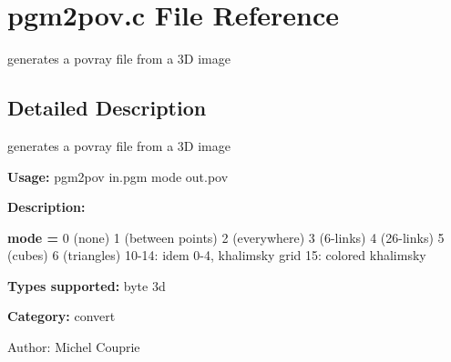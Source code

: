 \section{pgm2pov.c File Reference}
\label{pgm2pov_8c}
generates a povray file from a 3D image  




\label{_details}
\subsection{Detailed Description}
generates a povray file from a 3D image 

{\bf Usage:} pgm2pov in.pgm mode out.pov

{\bf Description:}

{\bf mode = } 0 (none) 1 (between points) 2 (everywhere) 3 (6-links) 4 (26-links) 5 (cubes) 6 (triangles) 10-14: idem 0-4, khalimsky grid 15: colored khalimsky

{\bf Types supported:} byte 3d

{\bf Category:} convert

\begin{Desc}
\item[Author:]Michel Couprie \end{Desc}
